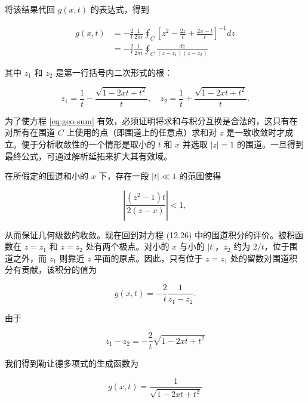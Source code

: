 将该结果代回 $g(x,t)$ 的表达式，得到

$$
\begin{aligned}
g(x, t) & =-\frac{2}{t} \frac{1}{2 \pi i} \oint_C\left[z^2-\frac{2 z}{t}+\frac{2 x-t}{t}\right]^{-1} d z \\
& =-\frac{2}{t} \frac{1}{2 \pi i} \oint_C \frac{d z}{\left(z-z_1\right)\left(z-z_2\right)}
\end{aligned}
$$

其中 $z_1$ 和 $z_2$ 是第一行括号内二次形式的根：

$$
z_1=\frac{1}{t}-\frac{\sqrt{1-2 x t+t^2}}{t}, \quad z_2=\frac{1}{t}+\frac{\sqrt{1-2 x t+t^2}}{t} .
$$

为了使方程 \eqref{eq:geo-sum} 有效，必须证明将求和与积分互换是合法的，这只有在对所有在围道 $C$ 上使用的点（即围道上的任意点）求和对 $z$ 是一致收敛时才成立。便于分析收敛性的一个情形是取小的 $t$ 和 $x$ 并选取 $|z|=1$ 的围道。一旦得到最终公式，可通过解析延拓来扩大其有效域。

在所假定的围道和小的 $x$ 下，存在一段 $|t|\ll 1$ 的范围使得

$$
\left|\frac{\left(z^2-1\right) t}{2(z-x)}\right|<1,
$$

从而保证几何级数的收敛。现在回到对方程 (12.26) 中的围道积分的评价。被积函数在 $z=z_1$ 和 $z=z_2$ 处有两个极点。对小的 $x$ 与小的 $|t|$，$z_2$ 约为 $2/t$，位于围道之外，而 $z_1$ 则靠近 $z$ 平面的原点。因此，只有位于 $z=z_1$ 处的留数对围道积分有贡献，该积分的值为

$$
g(x, t)=-\frac{2}{t} \frac{1}{z_1-z_2} .
$$

由于

$$
z_1-z_2=-\frac{2}{t} \sqrt{1-2 x t+t^2}
$$

我们得到勒让德多项式的生成函数为

$$
g(x, t)=\frac{1}{\sqrt{1-2 x t+t^2}}
$$
